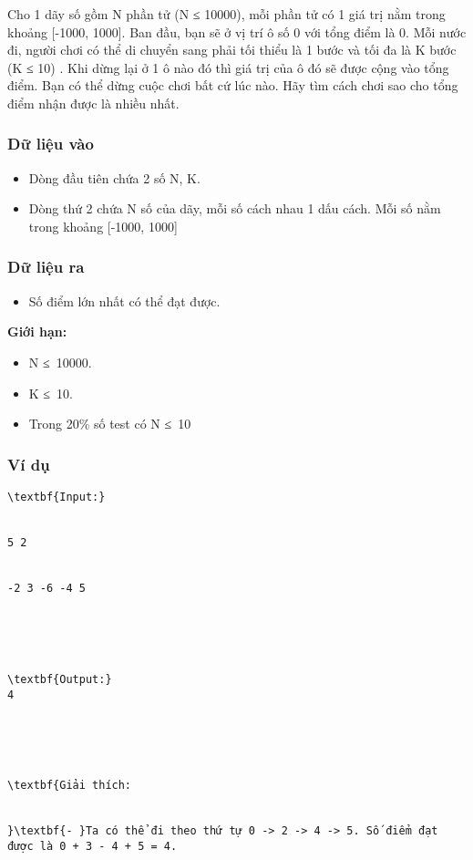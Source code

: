 



   Cho 1 dãy số gồm N phần tử (N ≤ 10000), mỗi phần tử có 1 giá trị nằm trong khoảng [-1000, 1000]. Ban đầu, bạn sẽ ở vị trí ô số 0 với tổng điểm là 0. Mỗi nước đi, người chơi có thể di chuyển sang phải tối thiểu là 1 bước và tối đa là K bước (K ≤ 10) . Khi dừng lại ở 1 ô nào đó thì giá trị của ô đó sẽ được cộng vào tổng điểm. Bạn có thể dừng cuộc chơi bất cứ lúc nào. Hãy tìm cách chơi sao cho tổng điểm nhận được là nhiều nhất.  

\subsubsection{   Dữ liệu vào  }
\begin{itemize}
	\item     Dòng đầu tiên chứa 2 số N, K.   
\end{itemize}
\begin{itemize}
	\item     Dòng thứ 2 chứa N số của dãy, mỗi số cách nhau 1 dấu cách. Mỗi số nằm trong khoảng [-1000, 1000]   
\end{itemize}

\subsubsection{   Dữ liệu ra  }
\begin{itemize}
	\item     Số điểm lớn nhất có thể đạt được.   
\end{itemize}

\textbf{    Giới hạn:   }
\begin{itemize}
	\item     N ≤ 10000.   
	\item     K ≤ 10.   
	\item     Trong 20\% số test có N ≤ 10   
\end{itemize}

\subsubsection{   Ví dụ  }
\begin{verbatim}
\textbf{Input:}


5 2


-2 3 -6 -4 5





\textbf{Output:}
4





\textbf{Giải thích:


}\textbf{- }Ta có thể đi theo thứ tự 0 -> 2 -> 4 -> 5. Số điểm đạt được là 0 + 3 - 4 + 5 = 4.\end{verbatim}
